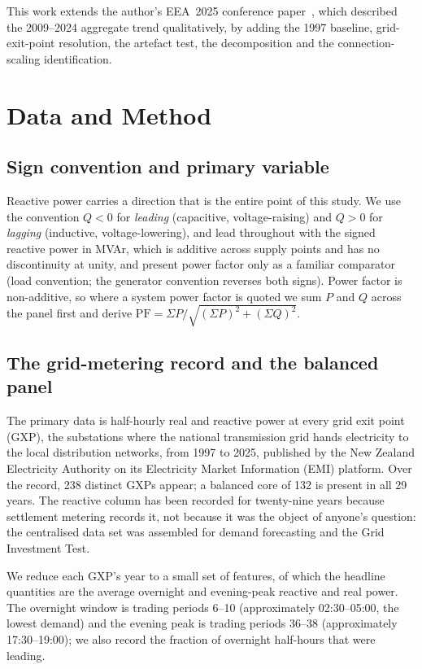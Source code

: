 \documentclass[journal]{IEEEtran}
\begin{document}
This work extends the author's EEA~2025 conference paper~\cite{hume2025}, which
described the 2009--2024 aggregate trend qualitatively, by adding the 1997
baseline, grid-exit-point resolution, the artefact test, the decomposition and the
connection-scaling identification.

\section{Data and Method}
\subsection{Sign convention and primary variable}
Reactive power carries a direction that is the entire point of this study. We
use the convention $Q<0$ for \emph{leading} (capacitive, voltage-raising) and
$Q>0$ for \emph{lagging} (inductive, voltage-lowering), and lead throughout with
the signed reactive power in MVAr, which is additive across supply points and has
no discontinuity at unity, and present power factor only as a familiar
comparator (load convention; the generator convention reverses both signs). Power factor is non-additive, so where a system power
factor is quoted we sum $P$ and $Q$ across the panel first and derive
$\mathrm{PF}=\Sigma P/\sqrt{(\Sigma P)^2+(\Sigma Q)^2}$.

\subsection{The grid-metering record and the balanced panel}
The primary data is half-hourly real and reactive power at every grid exit point
(GXP), the substations where the national transmission grid hands electricity to
the local distribution networks, from 1997 to 2025, published by the New Zealand
Electricity Authority on its Electricity Market Information (EMI) platform. Over
the record, 238 distinct GXPs appear; a balanced core of 132 is present in all 29
years. The reactive column has been recorded for twenty-nine years because
settlement metering records it, not because it was the object of anyone's
question: the centralised data set was assembled for demand forecasting and the
Grid Investment Test.

We reduce each GXP's year to a small set of features, of which the headline
quantities are the average overnight and evening-peak reactive and real power.
The overnight window is trading periods 6--10 (approximately 02:30--05:00, the
lowest demand) and the evening peak is trading periods 36--38 (approximately
17:30--19:00); we also record the fraction of overnight half-hours that were
leading.
\end{document}
